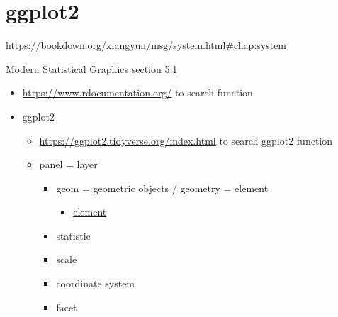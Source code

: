 \documentclass[
]{book}
\providecommand{\tightlist}{%
  \setlength{\itemsep}{0pt}\setlength{\parskip}{0pt}}
\theoremstyle{definition}
\theoremstyle{definition}
\theoremstyle{definition}
\theoremstyle{definition}
\theoremstyle{remark}
\begin{document}
\hypertarget{ggplot2}{%
\chapter{ggplot2}\label{ggplot2}}

\url{https://bookdown.org/xiangyun/msg/system.html\#chap:system}

Modern Statistical Graphics \href{https://bookdown.org/xiangyun/msg/system.html\#sec:ggplot2}{section 5.1}

\begin{itemize}
\tightlist
\item
  \url{https://www.rdocumentation.org/} to search function
\item
  ggplot2

  \begin{itemize}
  \tightlist
  \item
    \url{https://ggplot2.tidyverse.org/index.html} to search ggplot2 function
  \item
    panel = layer

    \begin{itemize}
    \tightlist
    \item
      geom = geometric objects / geometry = element

      \begin{itemize}
      \tightlist
      \item
        \href{https://bookdown.org/xiangyun/msg/elements.html\#cha:elements}{element}
      \end{itemize}
    \item
      statistic
    \item
      scale
    \item
      coordinate system
    \item
      facet
    \end{itemize}
  \end{itemize}
\end{itemize}
\end{document}
